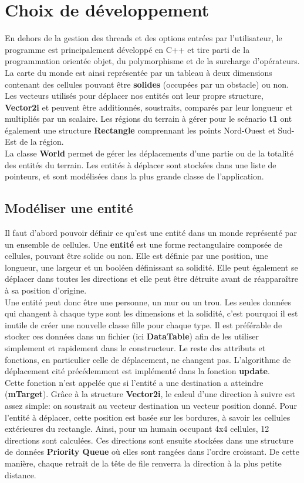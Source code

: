 \documentclass[11pt]{article} %
\begin{document}
\section{Choix de développement}
En dehors de la gestion des threads et des options entrées par l'utilisateur, le programme est principalement développé en C++ et tire parti de la programmation orientée objet, du polymorphisme et de la surcharge d'opérateurs. \\
La carte du monde est ainsi représentée par un tableau à deux dimensions contenant des cellules pouvant être \textbf{solides} (occupées par un obstacle) ou non. \\
Les vecteurs utilisés pour déplacer nos entités ont leur propre structure, \textbf{Vector2i} et peuvent être additionnés, soustraits, comparés par leur longueur et multipliés par un scalaire. Les régions du terrain à gérer pour le scénario \textbf{t1} ont également une structure \textbf{Rectangle} comprennant les points Nord-Ouest et Sud-Est de la région. \\
La classe \textbf{World} permet de gérer les déplacements d'une partie ou de la totalité des entités du terrain. Les entités à déplacer sont stockées dans une liste de pointeurs, et sont modélisées dans la plus grande classe de l'application.

\subsection{Modéliser une entité}
Il faut d'abord pouvoir définir ce qu'est une entité dans un monde représenté par un ensemble de cellules. 
Une \textbf{entité} est une forme rectangulaire composée de cellules, pouvant être solide ou non. Elle est définie par une position, une longueur, une largeur et un booléen définissant sa solidité. Elle peut également se déplacer dans toutes les directions et elle peut être détruite avant de réapparaître à sa position d'origine. \\
Une entité peut donc être une personne, un mur ou un trou. Les seules données qui changent à chaque type sont les dimensions et la solidité, c'est pourquoi il est inutile de créer une nouvelle classe fille pour chaque type. Il est préférable de stocker ces données dans un fichier (ici \textbf{DataTable}) afin de les utiliser simplement et rapidement dans le constructeur. Le reste des attributs et fonctions, en particulier celle de déplacement, ne changent pas.
 L'algorithme de déplacement cité précédemment est implémenté dans la fonction \textbf{update}. \\
Cette fonction n'est appelée que si l'entité a une destination a atteindre (\textbf{mTarget}). Grâce à la structure \textbf{Vector2i}, le calcul d'une direction à suivre est assez simple: on soustrait au vecteur destination un vecteur position donné. Pour l'entité à déplacer, cette position est basée sur les bordures, à savoir les cellules extérieures du rectangle. Ainsi, pour un humain occupant 4x4 cellules, 12 directions sont calculées. Ces directions sont ensuite stockées dans une structure de données \textbf{Priority Queue} où elles sont rangées dans l'ordre croissant. De cette manière, chaque retrait de la tête de file renverra la direction à la plus petite distance. \\
\end{document}
